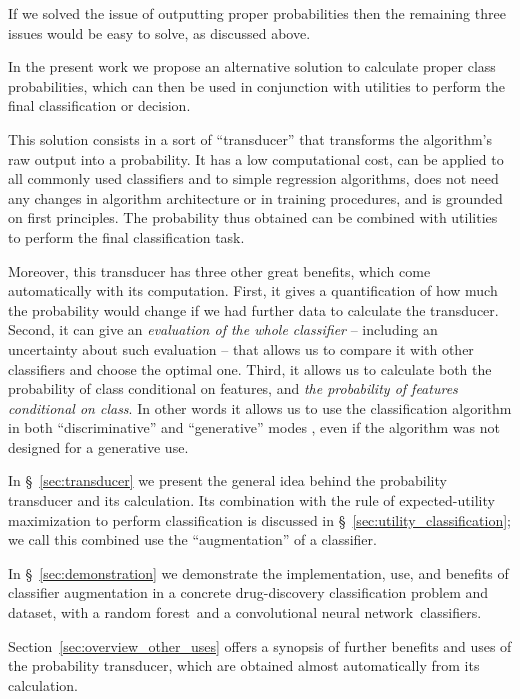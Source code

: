 \documentclass[\ifafour a4paper,12pt,\else a5paper,10pt,\fi%
onecolumn,oneside,article,%
british%
]{memoir}
\theoremstyle{remark}
\theoremstyle{innote}
\renewcommand*{\|}[1][]{\nonscript\:#1\vert\nonscript\:\mathopen{}}
\newcommand*{\sect}{\S}%
\newcommand*{\RF}{random forest}
\newcommand*{\CNN}{convolutional neural network}
\begin{document}
If we solved the issue of outputting proper probabilities then the remaining three issues would be easy to solve, as discussed above.

\bigskip

In the present work we propose an alternative solution to calculate proper class probabilities, which can then be used in conjunction with utilities to perform the final classification or decision.

This solution consists in a sort of \enquote{transducer} that transforms the algorithm's raw output into a probability. It has a low computational cost, can be applied to all commonly used classifiers and to simple regression algorithms, does not need any changes in algorithm architecture or in training procedures, and is grounded on first principles. The probability thus obtained can be combined with utilities to perform the final classification task.

Moreover, this transducer has three other great benefits, which come automatically with its computation. First, it gives a quantification of how much the probability would change if we had further data to calculate the transducer. Second, it can give an \emph{evaluation of the whole classifier} -- including an uncertainty about such evaluation -- that allows us to compare it with other classifiers and choose the optimal one. Third, it allows us to calculate both the probability of class conditional on features, and \emph{the probability of features conditional on class}. In other words it allows us to use the classification algorithm in both \enquote{discriminative} and \enquote{generative} modes \autocites[\sect~21.2.3]{russelletal1995_r2022}[\sect~8.6]{murphy2012}, even if the algorithm was not designed for a generative use.

In \sect~\ref{sec:transducer} we present the general idea behind the probability transducer and its calculation. Its combination with the rule of expected-utility maximization to perform classification is discussed in \sect~\ref{sec:utility_classification}; we call this combined use the \enquote{augmentation} of a classifier.

In \sect~\ref{sec:demonstration} we demonstrate the implementation, use, and benefits of classifier augmentation in a concrete drug-discovery classification problem and dataset, with a \RF\ and a \CNN\ classifiers.

Section~\ref{sec:overview_other_uses} offers a synopsis of further benefits and uses of the probability transducer, which are obtained almost automatically from its calculation.
\end{document}
